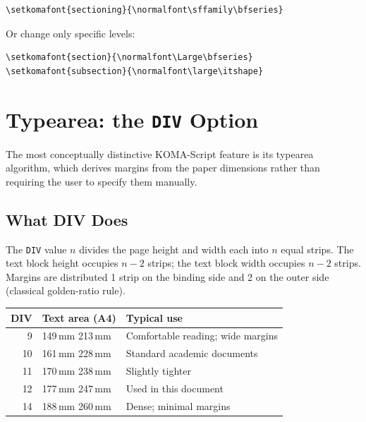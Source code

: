 \documentclass[
    12pt,               %
    a4paper,            %
    parskip=half,       %
    headings=small,     %
    DIV=12              %
]{scrartcl}
\begin{document}
\begin{verbatim}
\setkomafont{sectioning}{\normalfont\sffamily\bfseries}
\end{verbatim}

Or change only specific levels:

\begin{verbatim}
\setkomafont{section}{\normalfont\Large\bfseries}
\setkomafont{subsection}{\normalfont\large\itshape}
\end{verbatim}


\section{Typearea: the \texttt{DIV} Option}
\label{sec:div}

The most conceptually distinctive KOMA-Script feature is its typearea
algorithm, which derives margins from the paper dimensions rather than
requiring the user to specify them manually.

\subsection{What DIV Does}

The \texttt{DIV} value $n$ divides the page height and width each into $n$
equal strips. The text block height occupies $n-2$ strips; the text block
width occupies $n-2$ strips. Margins are distributed 1 strip on the binding
side and 2 on the outer side (classical golden-ratio rule).

\begin{center}
\begin{tabular}{rll}
\toprule
\textbf{DIV} & \textbf{Text area (A4)} & \textbf{Typical use} \\
\midrule
 9  & 149\,mm \texttimes{} 213\,mm & Comfortable reading; wide margins \\
10  & 161\,mm \texttimes{} 228\,mm & Standard academic documents \\
11  & 170\,mm \texttimes{} 238\,mm & Slightly tighter \\
12  & 177\,mm \texttimes{} 247\,mm & Used in this document \\
14  & 188\,mm \texttimes{} 260\,mm & Dense; minimal margins \\
\bottomrule
\end{tabular}
\end{center}
\end{document}
